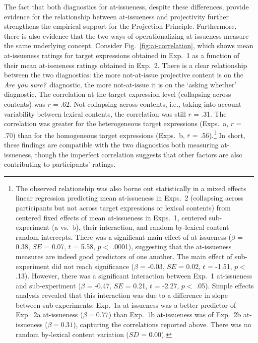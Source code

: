 \documentclass[11pt,fleqn]{article}
\newcommand{\6}{\mbox{$[\hspace*{-.6mm}[$}}
\newcommand{\9}{\mbox{$]\hspace*{-.6mm}]$}}
\newcommand{\figref}[1]{Fig.~\ref{#1}}
\begin{document}
The fact that both diagnostics for at-issueness, despite these differences, provide evidence for the relationship between at-issueness and projectivity  further strengthens the empirical support for the Projection Principle. Furthermore, there is also evidence that the two ways of operationalizing at-issueness measure the same underlying concept. Consider \figref{fig:ai-correlation}, which shows mean at-issueness ratings for target expressions obtained in Exp.~1 as a function of their mean at-issueness ratings obtained in Exp.~2. There is a clear relationship between the two diagnostics: the more not-at-issue projective content is on the {\em Are you sure?}~diagnostic, the more not-at-issue it is on the `asking whether' diagnostic. The correlation at the target expression level (collapsing across contents) was $r$ = .62. Not collapsing across contents, i.e., taking into account variability between lexical contents, the correlation was still $r$ = .31. The correlation was greater for the heterogeneous target expressions (Exps.~a, $r$ = .70) than for the homogeneous target expressions (Exps.~b, $r$ = .56).\footnote{The observed relationship was also borne out statistically in a mixed effects linear regression predicting mean at-issueness in Exps.~2 (collapsing across participants but not across target expressions or lexical contents) from centered fixed effects of mean at-issueness in Exps.~1, centered sub-experiment (a vs.~b), their interaction, and random by-lexical content random intercepts. There was a significant main effect of at-issueness ($\beta$ = 0.38, $SE$ = 0.07, $t$ = 5.58, $p <$ .0001), suggesting that the at-issueness measures are indeed good predictors of one another. The main effect of sub-experiment did not reach significance  ($\beta$ = -0.03, $SE$ = 0.02, $t$ = -1.51, $p <$ .13). However, there was a significant interaction between Exp.~1 at-issueness and sub-experiment ($\beta$ = -0.47, $SE$ = 0.21, $t$ = -2.27, $p <$ .05). Simple effects analysis revealed that this interaction was due to a difference in slope between sub-experiments: Exp.~1a at-issueness was a better predictor of Exp.~2a at-issueness ($\beta = 0.77$) than Exp.~1b at-issueness was of Exp.~2b at-issueness ($\beta = 0.31$), capturing the correlations reported above. There was no random by-lexical content variation  ($SD$ = 0.00).} In short, these findings are compatible with the two diagnostics both measuring at-issueness, though the imperfect correlation suggests that other factors are also contributing to participants' ratings.
\end{document}

